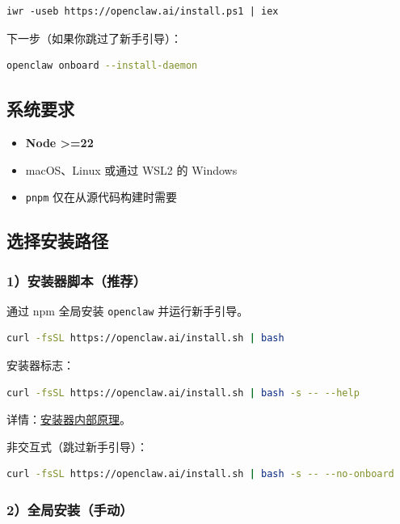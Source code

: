\begin{lstlisting}
iwr -useb https://openclaw.ai/install.ps1 | iex
\end{lstlisting}


下一步（如果你跳过了新手引导）：

\begin{lstlisting}[language=bash]
openclaw onboard --install-daemon
\end{lstlisting}


\subsection{系统要求}


\begin{itemize}
  \item \textbf{Node >=22}
  \item macOS、Linux 或通过 WSL2 的 Windows
  \item \texttt{pnpm} 仅在从源代码构建时需要
\end{itemize}


\subsection{选择安装路径}


\subsubsection{1）安装器脚本（推荐）}


通过 npm 全局安装 \texttt{openclaw} 并运行新手引导。

\begin{lstlisting}[language=bash]
curl -fsSL https://openclaw.ai/install.sh | bash
\end{lstlisting}


安装器标志：

\begin{lstlisting}[language=bash]
curl -fsSL https://openclaw.ai/install.sh | bash -s -- --help
\end{lstlisting}


详情：\href{/install/installer}{安装器内部原理}。

非交互式（跳过新手引导）：

\begin{lstlisting}[language=bash]
curl -fsSL https://openclaw.ai/install.sh | bash -s -- --no-onboard
\end{lstlisting}


\subsubsection{2）全局安装（手动）}



